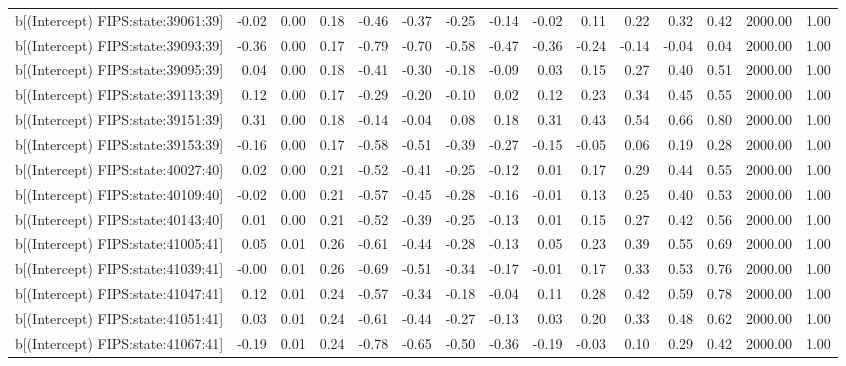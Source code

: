 \begin{table}[ht]
\begin{tabular}{rrrrrrrrrrrrrrr}
  b[(Intercept) FIPS:state:39061:39] & -0.02 & 0.00 & 0.18 & -0.46 & -0.37 & -0.25 & -0.14 & -0.02 & 0.11 & 0.22 & 0.32 & 0.42 & 2000.00 & 1.00 \\ 
  b[(Intercept) FIPS:state:39093:39] & -0.36 & 0.00 & 0.17 & -0.79 & -0.70 & -0.58 & -0.47 & -0.36 & -0.24 & -0.14 & -0.04 & 0.04 & 2000.00 & 1.00 \\ 
  b[(Intercept) FIPS:state:39095:39] & 0.04 & 0.00 & 0.18 & -0.41 & -0.30 & -0.18 & -0.09 & 0.03 & 0.15 & 0.27 & 0.40 & 0.51 & 2000.00 & 1.00 \\ 
  b[(Intercept) FIPS:state:39113:39] & 0.12 & 0.00 & 0.17 & -0.29 & -0.20 & -0.10 & 0.02 & 0.12 & 0.23 & 0.34 & 0.45 & 0.55 & 2000.00 & 1.00 \\ 
  b[(Intercept) FIPS:state:39151:39] & 0.31 & 0.00 & 0.18 & -0.14 & -0.04 & 0.08 & 0.18 & 0.31 & 0.43 & 0.54 & 0.66 & 0.80 & 2000.00 & 1.00 \\ 
  b[(Intercept) FIPS:state:39153:39] & -0.16 & 0.00 & 0.17 & -0.58 & -0.51 & -0.39 & -0.27 & -0.15 & -0.05 & 0.06 & 0.19 & 0.28 & 2000.00 & 1.00 \\ 
  b[(Intercept) FIPS:state:40027:40] & 0.02 & 0.00 & 0.21 & -0.52 & -0.41 & -0.25 & -0.12 & 0.01 & 0.17 & 0.29 & 0.44 & 0.55 & 2000.00 & 1.00 \\ 
  b[(Intercept) FIPS:state:40109:40] & -0.02 & 0.00 & 0.21 & -0.57 & -0.45 & -0.28 & -0.16 & -0.01 & 0.13 & 0.25 & 0.40 & 0.53 & 2000.00 & 1.00 \\ 
  b[(Intercept) FIPS:state:40143:40] & 0.01 & 0.00 & 0.21 & -0.52 & -0.39 & -0.25 & -0.13 & 0.01 & 0.15 & 0.27 & 0.42 & 0.56 & 2000.00 & 1.00 \\ 
  b[(Intercept) FIPS:state:41005:41] & 0.05 & 0.01 & 0.26 & -0.61 & -0.44 & -0.28 & -0.13 & 0.05 & 0.23 & 0.39 & 0.55 & 0.69 & 2000.00 & 1.00 \\ 
  b[(Intercept) FIPS:state:41039:41] & -0.00 & 0.01 & 0.26 & -0.69 & -0.51 & -0.34 & -0.17 & -0.01 & 0.17 & 0.33 & 0.53 & 0.76 & 2000.00 & 1.00 \\ 
  b[(Intercept) FIPS:state:41047:41] & 0.12 & 0.01 & 0.24 & -0.57 & -0.34 & -0.18 & -0.04 & 0.11 & 0.28 & 0.42 & 0.59 & 0.78 & 2000.00 & 1.00 \\ 
  b[(Intercept) FIPS:state:41051:41] & 0.03 & 0.01 & 0.24 & -0.61 & -0.44 & -0.27 & -0.13 & 0.03 & 0.20 & 0.33 & 0.48 & 0.62 & 2000.00 & 1.00 \\ 
  b[(Intercept) FIPS:state:41067:41] & -0.19 & 0.01 & 0.24 & -0.78 & -0.65 & -0.50 & -0.36 & -0.19 & -0.03 & 0.10 & 0.29 & 0.42 & 2000.00 & 1.00 \\ 

\end{tabular}
\end{table}
